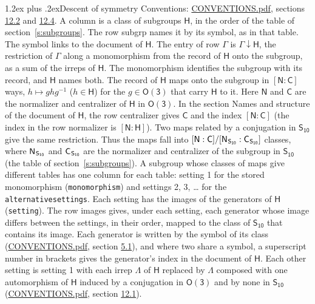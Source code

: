 \documentclass[10pt,a4paper]{article}
\makeatletter
\renewcommand\section{\@startsection{section}{1}{\z@}{-3ex plus -1ex minus -.2ex}%
  {1.2ex plus .2ex}{\normalfont\large\sffamily\bfseries\color{parttitle}}}
\numberwithin{equation}{section}
\newcommand{\grp}[1]{\mathsf{#1}}
\newcommand{\grpindex}[2]{[#1 : #2]}
\newcommand{\restr}[2]{#1\!\downarrow#2}
\newcommand{\hairsp}{\mkern1mu}
\makeatother
\begin{document}
\section{Descent of symmetry}\label{s:subduction}
Conventions: \href{../../CONVENTIONS.pdf}{CONVENTIONS.pdf}, sections \href{../../CONVENTIONS.pdf\#conv.12.2}{12.2} and \href{../../CONVENTIONS.pdf\#conv.12.4}{12.4}.
A column is a class of subgroups $\grp{H}$, in the order of the table of section~\ref{s:subgroups}. The row subgrp names it by its symbol, as in that table. The symbol links to the document of $\grp{H}$. The entry of row $\Gamma$ is $\restr{\Gamma}{\grp{H}}$, the restriction of $\Gamma$ along a monomorphism from the record of $\grp{H}$ onto the subgroup, as a sum of the irreps of $\grp{H}$. The monomorphism identifies the subgroup with its record, and $\grp{H}$ names both. \label{n:group.normalizer.o3}\label{n:group.centralizer.o3}The record of $\grp{H}$ maps onto the subgroup in $\grpindex{\grp{N}}{\grp{C}}$ ways, $h \mapsto g h g^{-1}$ ($h \in \grp{H}$) for the $g \in \grp{O(3)}$ that carry $\grp{H}$ to it. Here $\grp{N}$ and $\grp{C}$ are the normalizer and centralizer of $\grp{H}$ in \href{O3.pdf}{$\grp{O(3)}$}. In the section Names and structure of the document of $\grp{H}$, the row centralizer gives $\grp{C}$ and the index $\grpindex{\grp{N}}{\grp{C}}$ (the index in the row normalizer is $\grpindex{\grp{N}}{\grp{H}}$). Two maps related by a conjugation in $\grp{S_{10}}$ give the same restriction. Thus the maps fall into $\grpindex{\grp{N}}{\grp{C}}/\grpindex{\grp{N}_{\hairsp \grp{S_{10}}}}{\grp{C}_{\hairsp \grp{S_{10}}}}$ classes, where $\grp{N}_{\hairsp \grp{S_{10}}}$ and $\grp{C}_{\hairsp \grp{S_{10}}}$ are the normalizer and centralizer of the subgroup in $\grp{S_{10}}$ (the table of section~\ref{s:subgroups}). \label{n:head.setting}A subgroup whose classes of maps give different tables has one column for each table: setting 1 for the stored monomorphism (\texttt{monomorphism}) and settings 2, 3, \dots{} for the \texttt{alternativesettings}. Each setting has the images of the generators of $\grp{H}$ (\texttt{setting}). \label{n:head.images}The row images gives, under each setting, each generator whose image differs between the settings, in their order, mapped to the class of $\grp{S_{10}}$ that contains its image. Each generator is written by the symbol of its class (\href{../../CONVENTIONS.pdf}{CONVENTIONS.pdf}, section \href{../../CONVENTIONS.pdf\#conv.5.1}{5.1}), and where two share a symbol, a superscript number in brackets gives the generator's index in the document of $\grp{H}$. \label{n:irrep.Delta}Each other setting is setting 1 with each irrep $\Lambda$ of $\grp{H}$ replaced by $\Lambda$ composed with one automorphism of $\grp{H}$ induced by a conjugation in \href{O3.pdf}{$\grp{O(3)}$} and by none in $\grp{S_{10}}$ (\href{../../CONVENTIONS.pdf}{CONVENTIONS.pdf}, section \href{../../CONVENTIONS.pdf\#conv.12.1}{12.1}).
\end{document}
